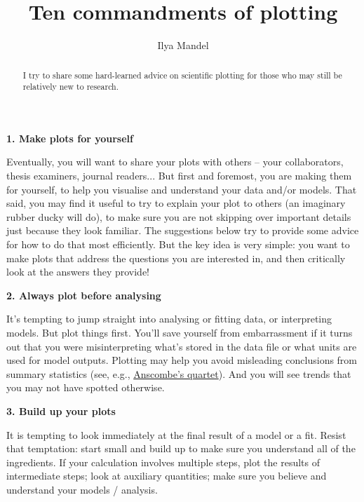 \documentclass[onecolumn]{aastex7}
\newcommand{\Header}[1]{{\large{\bf{#1}}}}
\begin{document}
\title{Ten commandments of plotting}
\author[0000-0002-6134-8946]{Ilya Mandel}


\begin{abstract}
I try to share some hard-learned advice on scientific plotting for those who may still be relatively new to research.
\end{abstract}

\maketitle

\vspace{0.1in}

\Header{1. Make plots for yourself}

Eventually, you will want to share your plots with others -- your collaborators, thesis examiners,  journal readers... But first and foremost, you are making them for yourself, to help you visualise and understand your data and/or models.  That said, you may find it useful to try to explain your plot to others (an imaginary rubber ducky will do), to make sure you are not skipping over important details just because they look familiar.  The suggestions below try to provide some advice for how to do that most efficiently.  But the key idea is very simple: you want to make plots that address the questions you are interested in, and then critically look at the answers they provide!  

\Header{2. Always plot before analysing}

It's tempting to jump straight into analysing or fitting data, or interpreting models.  But plot things first.  You'll save yourself from embarrassment if it turns out that you were misinterpreting what's stored in the data file or what units are used for model outputs.  Plotting may help you avoid misleading conclusions from summary statistics (see, e.g., \href{https://en.wikipedia.org/wiki/Anscombe\%27s_quartet}{Anscombe's quartet}).  And you will see trends that you may not have spotted otherwise.  

\Header{3. Build up your plots}

It is tempting to look immediately at the final result of a model or a fit.  Resist that temptation: start small and build up to make sure you understand all of the ingredients.  If your calculation involves multiple steps, plot the results of intermediate steps; look at auxiliary quantities; make sure you believe and understand your models / analysis.
\end{document}
